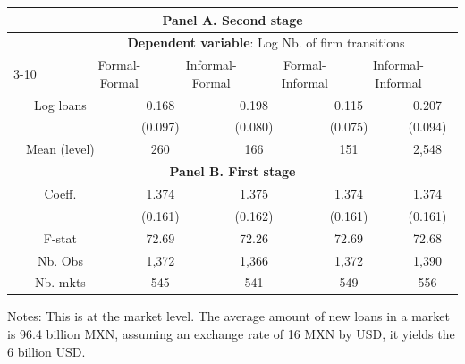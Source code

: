\centering
\begin{threeparttable}
\begin{tabular}{lccccccccc}
\toprule
\multicolumn{10}{c}{\textbf{Panel A. Second stage}} \\
\midrule
& \multicolumn{9}{c}{\textbf{Dependent variable}: Log Nb. of firm transitions} \\
\cmidrule(lr){3-10}
\multicolumn{2}{c}{} & \multicolumn{2}{c}{Formal-Formal} & \multicolumn{2}{c}{Informal-Formal} & \multicolumn{2}{c}{Formal-Informal} & \multicolumn{2}{c}{Informal-Informal} \\
\midrule 
\multicolumn{2}{c}{Log loans} & \multicolumn{2}{c}{0.168} & \multicolumn{2}{c}{0.198} & \multicolumn{2}{c}{0.115} & \multicolumn{2}{c}{0.207} \\
\multicolumn{2}{c}{} & \multicolumn{2}{c}{(0.097)} & \multicolumn{2}{c}{(0.080)} & \multicolumn{2}{c}{(0.075)} & \multicolumn{2}{c}{(0.094)} \\
\midrule
\multicolumn{2}{c}{Mean (level)} & \multicolumn{2}{c}{260} & \multicolumn{2}{c}{166} & \multicolumn{2}{c}{151} & \multicolumn{2}{c}{2,548} \\

\midrule
\multicolumn{10}{c}{\textbf{Panel B. First stage}} \\
\midrule
 \multicolumn{2}{c}{Coeff.}  & \multicolumn{2}{c}{1.374}   & \multicolumn{2}{c}{1.375}   & \multicolumn{2}{c}{1.374}   & \multicolumn{2}{c}{1.374} \\
\multicolumn{2}{c}{} & \multicolumn{2}{c}{(0.161)} & \multicolumn{2}{c}{(0.162)} & \multicolumn{2}{c}{(0.161)} & \multicolumn{2}{c}{(0.161)} \\
\multicolumn{2}{c}{F-stat}   & \multicolumn{2}{c}{72.69}  & \multicolumn{2}{c}{72.26}  & \multicolumn{2}{c}{72.69} & \multicolumn{2}{c}{72.68} \\
\multicolumn{2}{c}{Nb. Obs}  & \multicolumn{2}{c}{1,372}   & \multicolumn{2}{c}{1,366}   & \multicolumn{2}{c}{1,372} & \multicolumn{2}{c}{1,390} \\
\multicolumn{2}{c}{Nb. mkts} & \multicolumn{2}{c}{545}     & \multicolumn{2}{c}{541}     & \multicolumn{2}{c}{549} & \multicolumn{2}{c}{556} \\


\bottomrule
\end{tabular}
\begin{tablenotes}[flushleft]
\tiny
\item Notes: This is at the market level. The average amount of new loans in a market is 96.4 billion MXN, assuming an exchange rate of 16 MXN by USD, it yields the 6 billion USD.
\end{tablenotes}
\end{threeparttable}